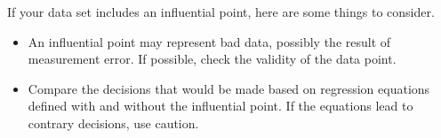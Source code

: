 \documentclass[residuals.tex]{subfiles}
\begin{document}
	If your data set includes an influential point, here are some things to consider.
	
	
	\begin{itemize}
		\item An influential point may represent bad data, possibly the result of measurement error. If possible, check the validity of the data point.
		
		\item Compare the decisions that would be made based on regression equations defined with and without the influential point. If the equations lead to contrary decisions, use caution.
		
	\end{itemize}
	
\end{document}
